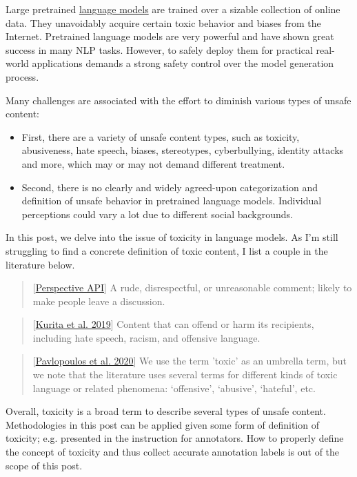 Large pretrained \href{https://lilianweng.github.io/posts/2019-01-31-lm/}{language models} are trained over a sizable collection of online data. They unavoidably acquire certain toxic behavior and biases from the Internet. Pretrained language models are very powerful and have shown great success in many NLP tasks. However, to safely deploy them for practical real-world applications demands a strong safety control over the model generation process.

Many challenges are associated with the effort to diminish various types of unsafe content:

\begin{itemize}
\tightlist
\item
  First, there are a variety of unsafe content types, such as toxicity, abusiveness, hate speech, biases, stereotypes, cyberbullying, identity attacks and more, which may or may not demand different treatment.
\item
  Second, there is no clearly and widely agreed-upon categorization and definition of unsafe behavior in pretrained language models. Individual perceptions could vary a lot due to different social backgrounds.
\end{itemize}

In this post, we delve into the issue of toxicity in language models. As I'm still struggling to find a concrete definition of toxic content, I list a couple in the literature below.

\begin{quote}
{[}\href{https://support.perspectiveapi.com/s/about-the-api-attributes-and-languages}{Perspective API}{]} A rude, disrespectful, or unreasonable comment; likely to make people leave a discussion.
\end{quote}

\begin{quote}
{[}\href{https://arxiv.org/abs/1912.06872}{Kurita et al. 2019}{]} Content that can offend or harm its recipients, including hate speech, racism, and offensive language.
\end{quote}

\begin{quote}
{[}\href{https://arxiv.org/abs/2006.00998}{Pavlopoulos et al. 2020}{]} We use the term 'toxic' as an umbrella term, but we note that the literature uses several terms for different kinds of toxic language or related phenomena: `offensive', `abusive', `hateful', etc.
\end{quote}

Overall, toxicity is a broad term to describe several types of unsafe content. Methodologies in this post can be applied given some form of definition of toxicity; e.g. presented in the instruction for annotators. How to properly define the concept of toxicity and thus collect accurate annotation labels is out of the scope of this post.

